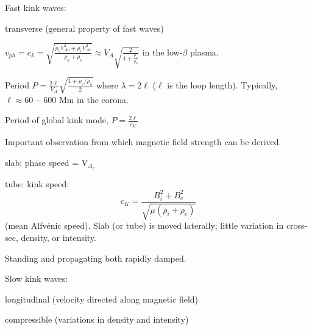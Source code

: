 \documentclass[12pt]{article}
\begin{document}
Fast kink waves:
\begin{itemize*}
    \item transverse (general property of fast waves)
    \item $v_{ph} = c_k = \sqrt{\frac{\rho_oV^2_{Ao}+\rho_eV^2_{Ae}}
        {\rho_o+\rho_e}} \approx V_A\sqrt{\frac{2}{1+\frac{\rho_e}{\rho_o}}} $
        in the low-$\beta$ plasma.
    \item Period $P=\frac{2\ell}{V_A}\sqrt{\frac{1+\rho_e/\rho_o}{2}}$
        where $\lambda=2\ell$ ($\ell$ is the loop length).
        Typically, $\ell \approx 60-600$ Mm in the corona.
    \item Period of global kink mode, $P = \frac{2\ell}{c_K}$
    \item Important observation from which magnetic field strength
        can be derived.
    \item slab: phase speed = V$_{A_e}$
    \item tube: kink speed:
        $$ c_K = \frac{B_i^2 + B_e^2}{\sqrt{\mu(\rho_i+\rho_e)}} $$
        (mean Alfv\'enic speed).
        Slab (or tube) is moved laterally; little variation in cross-sec,
        density, or intensity.
\end{itemize*}
Standing and propagating both rapidly damped.

Slow kink waves:
\begin{itemize*}
    \item longitudinal (velocity directed along magnetic field)
    \item compressible (variations in density and intensity)
\end{itemize*}
\end{document}
